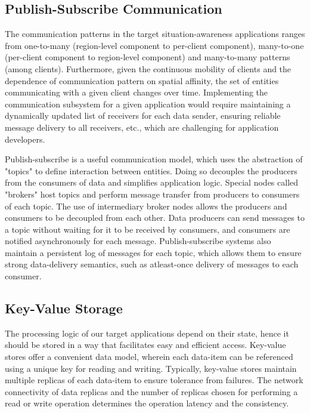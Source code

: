 \subsection{Publish-Subscribe Communication}
The communication patterns in the target situation-awareness applications ranges from one-to-many (region-level component to per-client component), many-to-one (per-client component to region-level component) and many-to-many patterns (among clients). Furthermore, given the continuous mobility of clients and the dependence of communication pattern on spatial affinity, the set of entities communicating with a given client changes over time. Implementing the communication subsystem for a given application would require maintaining a dynamically updated list of receivers for each data sender, ensuring reliable message delivery to all receivers, etc., which are challenging for application developers.
\par Publish-subscribe is a useful communication model, which uses the abstraction of "topics" to define interaction between entities. Doing so decouples the producers from the consumers of data and simplifies application logic. Special nodes called "brokers" host topics and perform message transfer from producers to consumers of each topic. The use of intermediary broker nodes allows the producers and consumers to be decoupled from each other. Data producers can send messages to a topic without waiting for it to be received by consumers, and consumers are notified asynchronously for each message. Publish-subscribe systems also maintain a persistent log of messages for each topic, which allows them to ensure strong data-delivery semantics, such as atleast-once delivery of messages to each consumer.

\subsection{Key-Value Storage}
The processing logic of our target applications depend on their state, hence it should be stored in a way that facilitates easy and efficient access. Key-value stores offer a convenient data model, wherein each data-item can be referenced using a unique key for reading and writing. Typically, key-value stores maintain multiple replicas of each data-item to ensure tolerance from failures. The network connectivity of data replicas and the number of replicas chosen for performing a read or write operation determines the operation latency and the consistency. 

